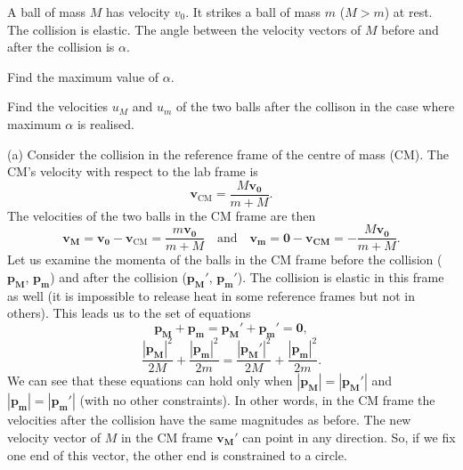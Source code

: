 \documentclass[../TST.tex]{subfiles}
\begin{document}
\begin{pproblem}
A ball of mass $M$ has velocity $v_0$. It strikes a ball of mass $m$ ($M>m$) at rest. The collision is elastic. The angle between the velocity vectors of $M$ before and after the collision is $\alpha$.
\begin{subpart}
\item Find the maximum value of $\alpha$.
\item Find the velocities $u_M$ and $u_m$ of the two balls after the collison in the case where maximum $\alpha$ is realised.
\end{subpart}
\end{pproblem}

\ifprob \else
\begin{solution}
(a) Consider the collision in the reference frame of the centre of mass (CM). The CM's velocity with respect to the lab frame is 
\begin{equation*}
	\mathbf{v_\mathrm{CM}}=\frac{M\mathbf{v_0}}{m+M}
.
\end{equation*}
The velocities of the two balls in the CM frame are then
\begin{equation*}
	\mathbf{v_M}=\mathbf{v_0}-\mathbf{v_\mathrm{CM}}=\frac{m\mathbf{v_0}}{m+M} \quad \mathrm{and} \quad \mathbf{v_m}=\mathbf{0}-\mathbf{v_{CM}}=-\frac{M\mathbf{v_0}}{m+M} 
.
\end{equation*}
Let us examine the momenta of the balls in the CM frame before the collision ($\mathbf{p_M}$, $\mathbf{p_m}$) and after the collision ($\mathbf{p_M'}$, $\mathbf{p_m'}$). The collision is elastic in this frame as well (it is impossible to release heat in some reference frames but not in others). This leads us to the set of equations
\begin{equation*}
	\mathbf{p_M}+\mathbf{p_m}=\mathbf{p_M'}+\mathbf{p_m'}=\mathbf{0}
,
\end{equation*}
\begin{equation*}
	\frac{|\mathbf{p_M}|^2}{2M}+\frac{|\mathbf{p_m}|^2}{2m}=\frac{|\mathbf{p_M'}|^2}{2M}+\frac{|\mathbf{p_m}|^2}{2m}
.
\end{equation*}
We can see that these equations can hold only when $|\mathbf{p_M}|=|\mathbf{p_M'}|$ and $|\mathbf{p_m}|=|\mathbf{p_m'}|$ (with no other constraints). In other words, in the CM frame the velocities after the collision have the same magnitudes as before. The new velocity vector of $M$ in the CM frame $\mathbf{v_M'}$ can point in any direction. So, if we fix one end of this vector, the other end is constrained to a circle.\\


\end{solution}
\end{document}
